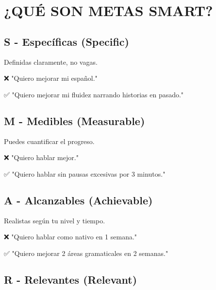 \documentclass[a4paper,11pt]{article}
\begin{document}
\vspace{0.2cm}

\section{¿QUÉ SON METAS SMART?}

\vspace{0.2cm}

\subsection{S - Específicas (Specific)}

Definidas claramente, no vagas.

\vspace{0.2cm}

❌ "Quiero mejorar mi español."

✅ "Quiero mejorar mi fluidez narrando historias en pasado."

\vspace{0.2cm}

\subsection{M - Medibles (Measurable)}

Puedes cuantificar el progreso.

\vspace{0.2cm}

❌ "Quiero hablar mejor."

✅ "Quiero hablar sin pausas excesivas por 3 minutos."

\vspace{0.2cm}

\subsection{A - Alcanzables (Achievable)}

Realistas según tu nivel y tiempo.

\vspace{0.2cm}

❌ "Quiero hablar como nativo en 1 semana."

✅ "Quiero mejorar 2 áreas gramaticales en 2 semanas."

\vspace{0.2cm}

\subsection{R - Relevantes (Relevant)}
\end{document}
